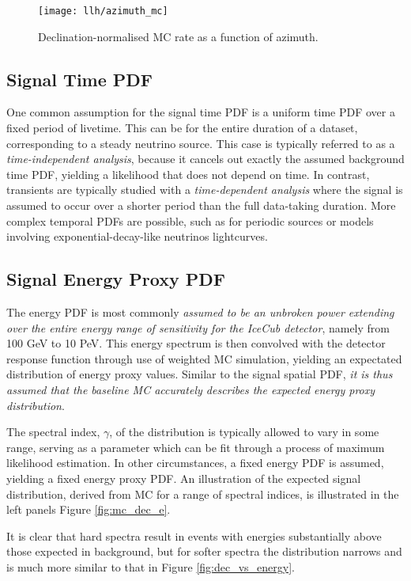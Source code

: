 \begin{figure}[!ht]
	\centering \texttt{[image: llh/azimuth\_mc]}
	\caption{Declination-normalised MC rate as a function of azimuth.}
	\label{fig:azimuth_mc}
\end{figure}

\subsection{Signal Time PDF}

One common assumption for the signal time PDF is a uniform time PDF over a fixed period of livetime. This can be for the entire duration of a dataset, corresponding to a steady neutrino source. This case is typically referred to as a \emph{time-independent analysis}, because it cancels out exactly the assumed background time PDF, yielding a likelihood that does not depend on time. In contrast, transients are typically studied with a \emph{time-dependent analysis} where the signal is assumed to occur over a shorter period than the full data-taking duration. More complex temporal PDFs are possible, such as for periodic sources or models involving exponential-decay-like neutrinos lightcurves.

\subsection{Signal Energy Proxy PDF}

The energy PDF is most commonly \emph{assumed to be an unbroken power extending over the entire energy range of sensitivity for the IceCub detector}, namely from 100 GeV to 10 PeV. This energy spectrum is then convolved with the detector response function through use of weighted MC simulation, yielding an expectated distribution of energy proxy values. Similar to the signal spatial PDF, \emph{it is thus assumed that the baseline MC accurately describes the expected energy proxy distribution}. 

The spectral index, $\gamma$, of the distribution is typically allowed to vary in some range, serving as a parameter which can be fit through a process of maximum likelihood estimation. In other circumstances, a fixed energy PDF is assumed, yielding a fixed energy proxy PDF. An illustration of the expected signal distribution, derived from MC for a range of spectral indices, is illustrated in the left panels Figure \ref{fig:mc_dec_e}.

It is clear that hard spectra result in events with energies substantially above those expected in background, but for softer spectra the distribution narrows and is much more similar to that in Figure \ref{fig:dec_vs_energy}. 

